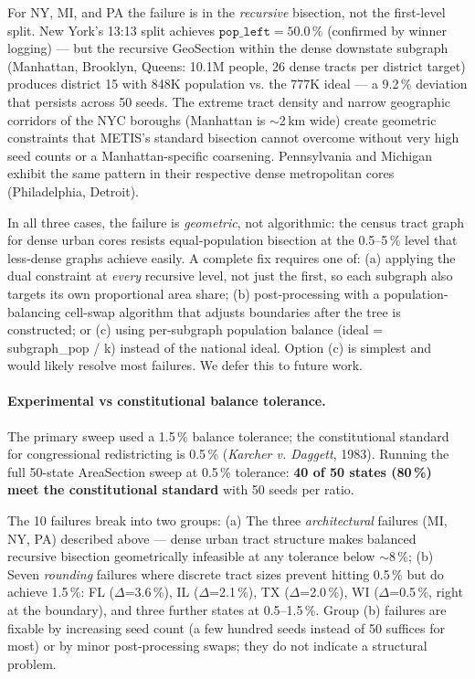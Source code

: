 For NY, MI, and PA the failure is in the \emph{recursive} bisection, not the
first-level split.
New York's 13:13 split achieves $\mathtt{pop\_left}=50.0\,\%$ (confirmed by
winner logging) --- but the recursive GeoSection within the dense downstate
subgraph (Manhattan, Brooklyn, Queens: 10.1M people, 26 dense tracts per
district target) produces district 15 with 848K population vs. the 777K ideal
--- a 9.2\,\% deviation that persists across 50 seeds.
The extreme tract density and narrow geographic corridors of the NYC boroughs
(Manhattan is $\sim$2\,km wide) create geometric constraints that METIS's
standard bisection cannot overcome without very high seed counts or a
Manhattan-specific coarsening.
Pennsylvania and Michigan exhibit the same pattern in their respective dense
metropolitan cores (Philadelphia, Detroit).

In all three cases, the failure is \emph{geometric}, not algorithmic: the
census tract graph for dense urban cores resists equal-population bisection at
the 0.5--5\,\% level that less-dense graphs achieve easily.
A complete fix requires one of:
(a) applying the dual constraint at \emph{every} recursive level, not just
    the first, so each subgraph also targets its own proportional area share;
(b) post-processing with a population-balancing cell-swap algorithm that
    adjusts boundaries after the tree is constructed; or
(c) using per-subgraph population balance (ideal = subgraph\_pop / k) instead
    of the national ideal.
Option (c) is simplest and would likely resolve most failures.
We defer this to future work.

\paragraph{Experimental vs constitutional balance tolerance.}
The primary sweep used a 1.5\,\% balance tolerance; the constitutional standard
for congressional redistricting is 0.5\,\% (\emph{Karcher v. Daggett}, 1983).
Running the full 50-state AreaSection sweep at 0.5\,\% tolerance: \textbf{40 of
50 states (80\,\%) meet the constitutional standard} with 50 seeds per ratio.

The 10 failures break into two groups:
(a) The three \emph{architectural} failures (MI, NY, PA) described above ---
dense urban tract structure makes balanced recursive bisection geometrically
infeasible at any tolerance below $\sim$8\,\%;
(b) Seven \emph{rounding} failures where discrete tract sizes prevent hitting
0.5\,\% but do achieve 1.5\,\%: FL ($\Delta$=3.6\,\%), IL ($\Delta$=2.1\,\%),
TX ($\Delta$=2.0\,\%), WI ($\Delta$=0.5\,\%, right at the boundary), and three
further states at 0.5--1.5\,\%.
Group (b) failures are fixable by increasing seed count (a few hundred seeds
instead of 50 suffices for most) or by minor post-processing swaps; they do not
indicate a structural problem.

